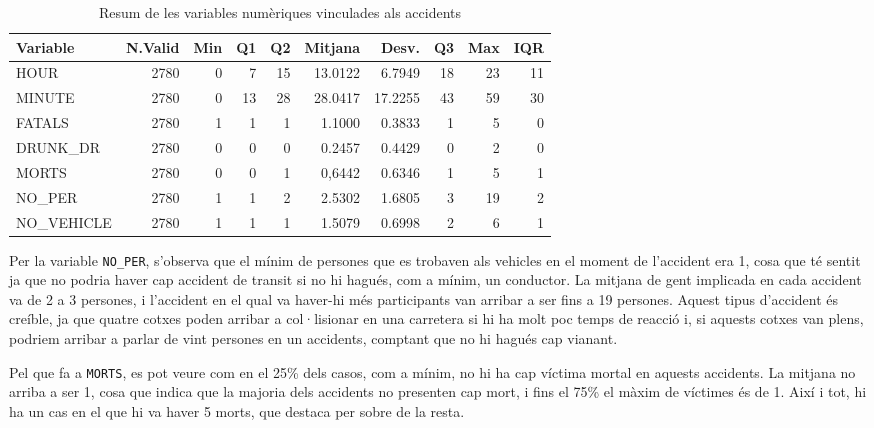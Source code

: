 \documentclass[12pt,longbibliography]{article}
\theoremstyle{definition}
\theoremstyle{remark}
\begin{document}
\begin{table}[H]
\centering
\begin{tabular}{lrrrrrrrrr}
\hline
Variable    & N.Valid & Min & Q1 & Q2 & Mitjana    & Desv.  & Q3 & Max & IQR \\ \hline
HOUR        & 2780    & 0   & 7  & 15      & 13.0122 & 6.7949       & 18 & 23  & 11  \\ \hline
MINUTE      & 2780    & 0   & 13 & 28      & 28.0417 & 17.2255      & 43 & 59  & 30  \\ \hline
FATALS      & 2780    & 1   & 1  & 1       & 1.1000  & 0.3833       & 1  & 5   & 0   \\ \hline
DRUNK\_DR   & 2780    & 0   & 0  & 0       & 0.2457  & 0.4429       & 0  & 2   & 0   \\ \hline
MORTS       & 2780    & 0   & 0  & 1       & 0,6442  & 0.6346       & 1  & 5  & 1   \\ \hline
NO\_PER     & 2780    & 1   & 1  & 2       & 2.5302  & 1.6805       & 3  & 19  & 2   \\ \hline
NO\_VEHICLE & 2780    & 1   & 1  & 1       & 1.5079  & 0.6998       & 2  & 6   & 1   \\ \hline
\end{tabular}
\caption{Resum de les variables numèriques vinculades als accidents}
\label{tab:num2-table}
\end{table}





Per la variable \texttt{NO\_PER}, s'observa que el mínim de persones que es trobaven als vehicles en el moment de l'accident era 1, cosa que té sentit ja que no podria haver cap accident de transit si no hi hagués, com a mínim, un conductor. La mitjana de gent implicada en cada accident va de 2 a 3 persones, i l'accident en el qual va haver-hi més participants van arribar a ser fins a 19 persones. Aquest tipus d'accident és creíble, ja que quatre cotxes poden arribar a col·lisionar en una carretera si hi ha molt poc temps de reacció i, si aquests cotxes van plens, podriem arribar a parlar de vint persones en un accidents, comptant que no hi hagués cap vianant.

Pel que fa a \texttt{MORTS}, es pot veure com en el 25\% dels casos, com a mínim, no hi ha cap víctima mortal en aquests accidents. La mitjana no arriba a ser 1, cosa que indica que la majoria dels accidents no presenten cap mort, i fins el 75\% el màxim de víctimes és de 1. Així i tot, hi ha un cas en el que hi va haver 5 morts, que destaca per sobre de la resta. 
\end{document}
